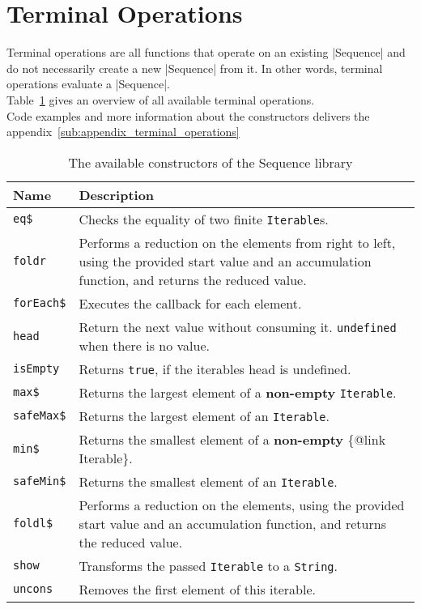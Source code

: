 \section{Terminal Operations} %
\label{sec:Terminal Operations}
Terminal operations are all functions that operate on an existing |Sequence|
and do not necessarily create a new |Sequence| from it. In other words,
terminal operations evaluate a |Sequence|.\\ 
Table~\ref{tab:api_term_ops} gives an overview of all available terminal
operations.\\
Code examples and more information about the constructors delivers the
appendix~\ref{sub:appendix_terminal_operations}

\begin{table}[H]
  \centering
  \begin{tabularx}{\textwidth}{| l | X |} \hline
    \textbf{Name} & \textbf{Description} \\ \hline
    \texttt{eq\$} & Checks the equality of two finite \texttt{Iterable}s. \\ \hline 
    \texttt{foldr} & Performs a reduction on the elements from right to left, using the provided start value and an accumulation function, and returns the reduced value. \\ \hline 
    \texttt{forEach\$} & Executes the callback for each element. \\ \hline 
    \texttt{head} & Return the next value without consuming it. \texttt{undefined} when there is no value. \\ \hline 
    \texttt{isEmpty} & Returns \texttt{true}, if the iterables head is undefined. \\ \hline 
    \texttt{max\$} & Returns the largest element of a \textbf{non-empty} \texttt{Iterable}. \\ \hline 
    \texttt{safeMax\$} & Returns the largest element of an \texttt{Iterable}. \\ \hline 
    \texttt{min\$} & Returns the smallest element of a \textbf{non-empty} \{@link Iterable\}. \\ \hline 
    \texttt{safeMin\$} & Returns the smallest element of an \texttt{Iterable}. \\ \hline 
    \texttt{foldl\$} & Performs a reduction on the elements, using the provided start value and an accumulation function, and returns the reduced value. \\ \hline 
    \texttt{show} & Transforms the passed \texttt{Iterable} to a \texttt{String}. \\ \hline 
    \texttt{uncons} & Removes the first element of this iterable. \\ \hline 

  \end{tabularx}
  \caption{The available constructors of the Sequence library}
  \label{tab:api_term_ops}
\end{table}

